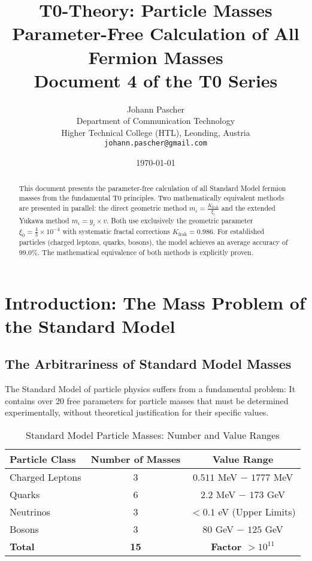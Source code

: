 \documentclass[12pt,a4paper]{article}
\title{\textbf{T0-Theory: Particle Masses}\\[0.5cm]
	\large Parameter-Free Calculation of All Fermion Masses\\[0.3cm]
	\normalsize Document 4 of the T0 Series}
\author{Johann Pascher\\
	Department of Communication Technology\\
	Higher Technical College (HTL), Leonding, Austria\\
	\texttt{johann.pascher@gmail.com}}
\date{\today}
\begin{document}
	
	\maketitle
	
	\begin{abstract}
		This document presents the parameter-free calculation of all Standard Model fermion masses from the fundamental T0 principles. Two mathematically equivalent methods are presented in parallel: the direct geometric method $m_i = \frac{K_{\text{frak}}}{\xi_i}$ and the extended Yukawa method $m_i = y_i \times v$. Both use exclusively the geometric parameter $\xi_0 = \frac{4}{3} \times 10^{-4}$ with systematic fractal corrections $K_{\text{frak}} = 0.986$. For established particles (charged leptons, quarks, bosons), the model achieves an average accuracy of 99.0\%. The mathematical equivalence of both methods is explicitly proven.
	\end{abstract}
	
	\tableofcontents
	\newpage
	
	\section{Introduction: The Mass Problem of the Standard Model}
	
	\subsection{The Arbitrariness of Standard Model Masses}
	
	The Standard Model of particle physics suffers from a fundamental problem: It contains over 20 free parameters for particle masses that must be determined experimentally, without theoretical justification for their specific values.
	
	\begin{table}[h]
		\centering
		\begin{tabular}{lcc}
			\toprule
			\textbf{Particle Class} & \textbf{Number of Masses} & \textbf{Value Range} \\
			\midrule
			Charged Leptons & 3 & $0.511$ MeV $-$ $1777$ MeV \\
			Quarks & 6 & $2.2$ MeV $-$ $173$ GeV \\
			Neutrinos & 3 & $< 0.1$ eV (Upper Limits) \\
			Bosons & 3 & $80$ GeV $-$ $125$ GeV \\
			\midrule
			\textbf{Total} & \textbf{15} & \textbf{Factor $> 10^{11}$} \\
			\bottomrule
		\end{tabular}
		\caption{Standard Model Particle Masses: Number and Value Ranges}
	\end{table}
	
\end{document}
